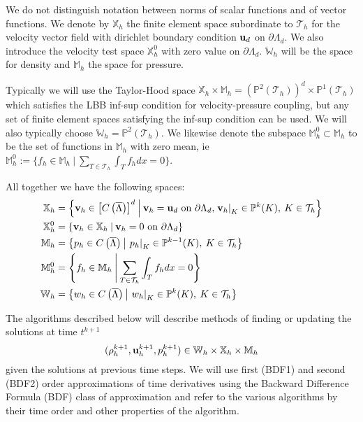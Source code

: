 \documentclass[letterpaper]{erdc}
\begin{document}
We do not distinguish notation between norms of scalar functions and of vector functions.  We denote by $\mathbb{X}_h$ the finite element space subordinate to $\mathcal{T}_h$ for the velocity vector field with dirichlet boundary condition $\textbf{u}_d$ on $\partial\Lambda_{d}$.  We also introduce the velocity test space $\mathbb{X}_h^0$ with zero value on $\partial\Lambda_d$.  $\mathbb{W}_h$ will be the space for density and $\mathbb{M}_h$ the space for pressure. 

Typically we will use the Taylor-Hood space $\mathbb{X}_h \times \mathbb{M}_h = \left(\mathbb{P}^2\left(\mathcal{T}_h\right)\right)^d\times \mathbb{P}^1\left(\mathcal{T}_h\right)$ which satisfies the LBB inf-sup condition for velocity-pressure coupling, but any set of finite element spaces satisfying the inf-sup condition can be used.  We will also typically choose $\mathbb{W}_h = \mathbb{P}^2\left(\mathcal{T}_h\right)$.  We likewise denote the subspace $\mathbb{M}_h^0\subset \mathbb{M}_h$ to be the set of functions in $\mathbb{M}_h$ with zero mean, ie $\mathbb{M}_h^0 := \{ f_h\in \mathbb{M}_h \:|\: \sum_{T\in\mathcal{T}_h}\int_{T}f_h dx = 0\}$.

All together we have the following spaces:
\begin{align*}  
	\mathbb{X}_h &= \left\{\textbf{v}_h\in \left[C\left(\overline{\Lambda}\right)\right]^d \:\middle|\: \textbf{v}_h = \textbf{u}_d \mbox{ on } \partial\Lambda_{d}, \left.\textbf{v}_h\right|_{K}\in\mathbb{P}^{k}(K), \:K\in\mathcal{T}_h  \right\} \\
  	\mathbb{X}^0_h &= \left\{\textbf{v}_h\in \mathbb{X}_h \:\middle|\: \textbf{v}_h = 0 \mbox{ on } \partial\Lambda_{d} \right\} \\
		\mathbb{M}_h &= \left\{p_h\in C\left(\overline{\Lambda}\right) \:\middle|\: \left.p_h\right|_{K}\in\mathbb{P}^{k-1}(K),\: K\in\mathcal{T}_h  \right\}\\
    \mathbb{M}_h^0 &= \left\{f_h\in \mathbb{M}_h \:\middle|\: \sum_{T\in\mathcal{T}_h}\int_{T}f_h dx = 0 \right\}\\
    \mathbb{W}_h &= \left\{w_h\in C\left(\overline{\Lambda}\right) \:\middle|\: \left.w_h\right|_{K}\in\mathbb{P}^{k}(K), \:K\in\mathcal{T}_h  \right\}
\end{align*} 

The algorithms described below will describe methods of finding or updating the solutions at time $t^{k+1}$
\begin{equation}(\rho^{k+1}_h, \textbf{u}^{k+1}_{h}, p^{k+1}_h) \in \mathbb{W}_h\times\mathbb{X}_h\times \mathbb{M}_h  \end{equation}
given the solutions at previous time steps.  We will use first (BDF1) and second (BDF2) order approximations of time derivatives using the Backward Difference Formula (BDF) class of approximation and refer to the various algorithms by their time order and other properties of the algorithm.
\end{document}
